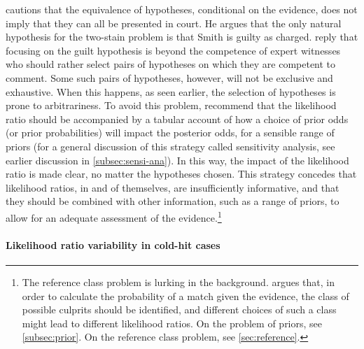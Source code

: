 \documentclass{article}
\begin{document}
\citet{dawid2004likelihood} cautions that the equivalence of hypotheses, conditional on the evidence, does not imply that they can all be presented in court. He argues that the only natural hypothesis for the two-stain problem is that Smith is guilty as charged. \cite{meester2004ResponseDawidBalding} reply that focusing on the guilt hypothesis is beyond the competence of expert witnesses who should rather select pairs of hypotheses on which they are competent to comment.  Some such pairs of hypotheses, however, will not be exclusive and exhaustive. When this happens, as seen earlier, the selection of hypotheses is prone to arbitrariness.
To avoid this problem, \cite{meester2004WhyEffectPriora} recommend that the likelihood ratio should be accompanied by a tabular account of how a choice of prior odds (or prior probabilities) will impact the posterior odds, for a sensible range of priors (for a general discussion of this strategy called sensitivity analysis, see earlier discussion in \ref{subsec:sensi-ana}). In this way, the impact of the likelihood ratio is made clear, no matter the hypotheses chosen. This strategy concedes that likelihood ratios, in and of themselves, are insufficiently informative, and that they should be combined with other information, such as a range of priors, to allow for an adequate assessment of the evidence.\footnote{The reference class problem 
is lurking in the background.  \citet{balding2004comment} argues that, in order to calculate the probability of a match given the evidence, the class of possible culprits should be identified, and  different choices of such a class might lead to different likelihood ratios. On the problem of priors, see \ref{subsec:prior}. On the reference class problem, see \ref{sec:reference}.}

%
%

\paragraph{Likelihood ratio variability in cold-hit cases}

\end{document}
